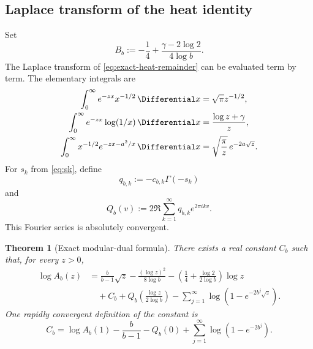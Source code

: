 \documentclass[11pt]{article}
\newtheorem{theorem}{Theorem}[section]
\theoremstyle{definition}
\theoremstyle{remark}
\begin{document}
\subsection{Laplace transform of the heat identity}

Set
\begin{equation}\label{eq:B-constant}
 B_b:=-\frac14+\frac{\gamma-2\log2}{4\log b}.
\end{equation}
The Laplace transform of \eqref{eq:exact-heat-remainder} can be evaluated term by term.  The elementary integrals are
\begin{align}
 \int_0^\infty e^{-zx}x^{-1/2}\,\Differential x&=\sqrt\pi z^{-1/2},\\
 \int_0^\infty e^{-zx}\log(1/x)\,\Differential x&=\frac{\log z+\gamma}{z},\\
 \int_0^\infty x^{-1/2}e^{-zx-a^2/x}\,\Differential x
 &=\sqrt{\frac\pi z}\,e^{-2a\sqrt z}.
\end{align}
For \(s_k\) from \eqref{eq:sk}, define
\begin{equation}\label{eq:qbk}
  q_{b,k}:=-c_{b,k}\Gamma(-s_k)
\end{equation}
and
\begin{equation}\label{eq:Qb}
  Q_b(v):=2\Re\sum_{k=1}^{\infty}q_{b,k}e^{2\pi ikv}.
\end{equation}
This Fourier series is absolutely convergent.

\begin{theorem}[Exact modular-dual formula]\label{thm:modular-dual}
There exists a real constant \(C_b\) such that, for every \(z>0\),
\begin{equation}\label{eq:modular-dual}
\boxed{\begin{aligned}
 \log A_b(z)
 &=\frac{b}{b-1}\sqrt z
 -\frac{(\log z)^2}{8\log b}
 -\left(\frac14+\frac{\log2}{2\log b}\right)\log z\\
 &\quad+C_b
 +Q_b\!\left(\frac{\log z}{2\log b}\right)
 -\sum_{j=1}^{\infty}\log\!\left(1-e^{-2b^j\sqrt z}\right).
\end{aligned}}
\end{equation}
One rapidly convergent definition of the constant is
\begin{equation}\label{eq:Cb-definition}
 C_b=\log A_b(1)-\frac{b}{b-1}-Q_b(0)
 +\sum_{j=1}^{\infty}\log(1-e^{-2b^j}).
\end{equation}
\end{theorem}
\end{document}
